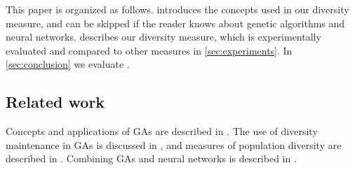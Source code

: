 This paper is organized as follows.  introduces the concepts used in our diversity measure, and can be skipped if the reader knows about genetic algorithms and neural networks.  describes our diversity measure, which is experimentally evaluated and compared to other measures in \cref{sec:experiments}. In \cref{sec:conclusion} we evaluate \dia.

\subsection{Related work}
Concepts and applications of GAs are described in \cite{Cobb93geneticalgorithms,DeJong:1975:ABC:907087,Luke2013Metaheuristics,Syswerda:1989:UCG:645512.657265,ursem2002diversity,fogarty,Whitley:1989:GAS:93126.93169,1250187}. The use of diversity maintenance in GAs is discussed in \cite{diaz2007empirical,Zitzler00comparisonof,Darwen00doesextra,1266373}, and measures of population diversity are described in \cite{Nguyen:2006:ASPGP,simpson1949measurement}. Combining GAs and neural networks is described in \cite{masterThesisGANN}.
